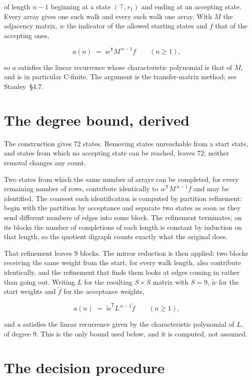 \documentclass[11pt]{article}
\theoremstyle{definition}
\begin{document}
of length $n-1$ beginning at a state $(\top,r_1)$ and ending at an accepting state. Every array gives one such walk and every such walk one array. With $M$ the adjacency matrix, $w$ the indicator of the allowed starting states and $f$ that of the accepting ones,

\[a(n) \;=\; w^{\mathsf T} M^{\,n-1} f \qquad (n \ge 1),\]

so $a$ satisfies the linear recurrence whose characteristic polynomial is that of $M$, and is in particular C-finite. The argument is the transfer-matrix method; see Stanley~\S4.7.

\section{The degree bound, derived}

The construction gives $72$ states. Removing states unreachable from a start state, and states from which no accepting state can be reached, leaves $72$; neither removal changes any count.

Two states from which the same number of arrays can be completed, for every remaining number of rows, contribute identically to $w^{\mathsf T}M^{\,n-1}f$ and may be identified. The coarsest such identification is computed by partition refinement: begin with the partition by acceptance and separate two states as soon as they send different numbers of edges into some block. The refinement terminates; on its blocks the number of completions of each length is constant by induction on that length, so the quotient digraph counts exactly what the original does.

That refinement leaves $9$ blocks. The mirror reduction is then applied: two blocks receiving the same weight from the start, for every walk length, also contribute identically, and the refinement that finds them looks at edges coming in rather than going out. Writing $L$ for the resulting $S \times S$ matrix with $S = 9$, $\tilde w$ for the start weights and $\tilde f$ for the acceptance weights,

\[a(n) \;=\; \tilde w^{\mathsf T} L^{\,n-1} \tilde f \qquad (n \ge 1),\]

and $a$ satisfies the linear recurrence given by the characteristic polynomial of $L$, of degree $9$. This is the only bound used below, and it is computed, not assumed.

\section{The decision procedure}
\end{document}
